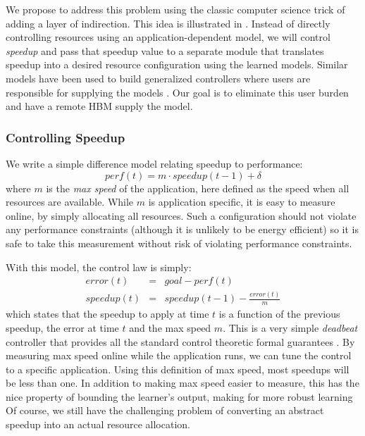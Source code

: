 We propose to address this problem using the classic computer science
trick of adding a layer of indirection.  This idea is illustrated in
.  Instead of directly controlling resources using an
application-dependent model, we will control \emph{speedup} and pass
that speedup value to a separate module that translates speedup into a
desired resource configuration using the learned models.  Similar
models have been used to build generalized controllers where users are
responsible for supplying the models \cite{POET}.  Our goal is to
eliminate this user burden and have a remote HBM supply the model.

\subsubsection{Controlling Speedup}
We write a simple difference model relating speedup to performance:
\begin{equation}
  perf(t) = m \cdot speedup(t-1) + \delta \label{eqn:speedup}
\end{equation}
where $m$ is the \emph{max speed} of the application, here defined as
the speed when all resources are available.  While $m$ is application
specific, it is easy to measure online, by simply allocating all
resources. Such a configuration should not violate any performance
constraints (although it is unlikely to be energy efficient) so it is
safe to take this measurement without risk of violating performance
constraints.

With this model, the control law is simply:
\begin{eqnarray}
  error(t) &=& goal - perf(t) \label{eqn:speedup-error} \\
  speedup(t) &=& speedup(t-1) - \frac{error(t)}{m}
  \label{eqn:speedup-control}
\end{eqnarray}
which states that the speedup to apply at time $t$ is a function of
the previous speedup, the error at time $t$ and the max speed $m$.
This is a very simple \emph{deadbeat} controller that provides all the
standard control theoretic formal guarantees
\cite{controlhandbook,seec-scs2010}.  By measuring max speed online
while the application runs, we can tune the control to a specific
application.  Using this definition of max speed, most
speedups will be less than one.  In addition to making max speed
easier to measure, this has the nice property of bounding the
learner's output, making for more robust learning  Of
course, we still have the challenging problem of converting an
abstract speedup into an actual resource allocation.


